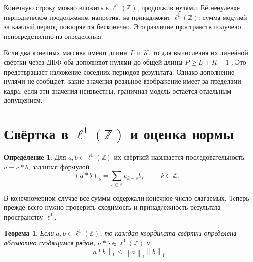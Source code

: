 \documentclass[12pt,a4paper]{article}
\newtheorem{theorem}{Теорема}
\theoremstyle{definition}
\newtheorem{definition}{Определение}
\theoremstyle{remark}
\newcommand{\ZZ}{\mathbb{Z}}
\newcommand{\norm}[1]{\left\lVert #1\right\rVert}
\begin{document}
Конечную строку можно вложить в $\ell^1(\ZZ)$, продолжив нулями.
Её ненулевое периодическое продолжение, напротив, не принадлежит
$\ell^1(\ZZ)$: сумма модулей за каждый период повторяется бесконечно.
Это различие пространств получено непосредственно из определения.

Если два конечных массива имеют длины $L$ и $K$, то для вычисления
их линейной свёртки через ДПФ оба дополняют нулями до общей длины
$P\geqslant L+K-1$ \cite[\S\,4.6.6, с.~300]{GW2012}.
Это предотвращает наложение соседних периодов результата.
Однако дополнение нулями не сообщает, какие значения реальное
изображение имеет за пределами кадра: если эти значения неизвестны,
граничная модель остаётся отдельным допущением.

\section{Свёртка в \texorpdfstring{$\ell^1(\ZZ)$}{l1(Z)}
  и оценка нормы}

\begin{definition}
Для $a,b\in\ell^1(\ZZ)$ их свёрткой называется последовательность
$c=a*b$, заданная формулой
\[
  \boxed{(a*b)_k=\sum_{s\in\ZZ}a_{k-s}b_s},\qquad k\in\ZZ.
\]
\end{definition}

В конечномерном случае все суммы содержали конечное число слагаемых.
Теперь прежде всего нужно проверить сходимость и принадлежность
результата пространству $\ell^1$.

\begin{theorem}
Если $a,b\in\ell^1(\ZZ)$, то каждая координата свёртки определена
абсолютно сходящимся рядом, $a*b\in\ell^1(\ZZ)$ и
\[
  \boxed{\norm{a*b}_1\leqslant\norm{a}_1\norm{b}_1}.
\]
\end{theorem}
\end{document}
